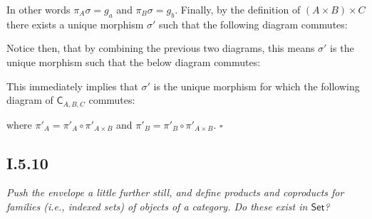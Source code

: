 \documentclass[11pt,a4paper]{article}
\begin{document}
\noindent In other words $\pi_A \sigma = g_a$ and $\pi_B \sigma = g_b$.  Finally, by the definition of $(A \times B) \times C$ there exists a unique morphism $\sigma '$ such that the following diagram commutes:

\begin{center}
\end{center}

\noindent Notice then, that by combining the previous two diagrams, this means $\sigma'$ is the unique morphism such that the below diagram commutes:

\begin{center}
\end{center}

\noindent This immediately implies that $\sigma'$ is the unique morphism for which the following diagram of $\textsf{C}_{A,B,C}$ commutes:

\begin{center}
\end{center}

\noindent where $\pi'_A = \pi'_A \circ \pi'_{A \times B}$ and $\pi'_B = \pi'_B \circ \pi'_{A \times B}$. $\square$

\subsection*{I.5.10} \textit{Push the envelope a little further still, and define products and coproducts for families (i.e., indexed sets) of objects of a category.  Do these exist in $\textsf{Set}$?} \\
\end{document}
